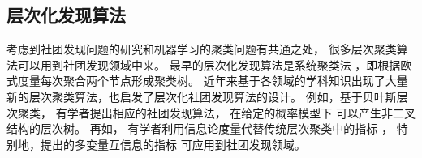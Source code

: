 \subsection{层次化发现算法}
考虑到社团发现问题的研究和机器学习的聚类问题有共通之处，
很多层次聚类算法可以用到社团发现领域中来。
最早的层次化发现算法是系统聚类法 \cite{slink}，即根据欧式度量每次聚合两个节点形成聚类树。
近年来基于各领域的学科知识出现了大量新的层次聚类算法，也启发了层次化社团发现算法的设计。
例如，基于贝叶斯层次聚类\cite{heller2005bhc}，
有学者提出相应的社团发现算法\cite{blundell2011discovering, blundell2013bhcd}，
在给定的概率模型下
可以产生非二叉结构的层次树。
再如，
有学者利用信息论度量代替传统层次聚类中的指标
\cite{gokcay2002clustering,aghagolzadeh2007hierarchical}，
特别地，\citet{chan2016ic}提出的多变量互信息的指标
可应用到社团发现领域\cite{chan2017pin}。

